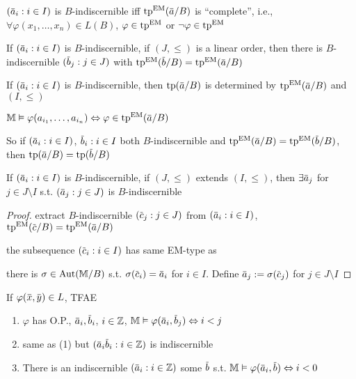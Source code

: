 \documentclass[11pt]{article}
\begin{document}
\begin{remark}
\((\bara_i:i\in I)\) is \(B\)-indiscernible iff \(\tp^{\EM}(\bara/B)\) is ``complete'',
i.e., \(\forall\varphi(x_1,\dots,x_n)\in L(B)\), \(\varphi\in\operatorname{tp}^{\operatorname{EM}}\) or \(\neg\varphi\in\operatorname{tp}^{\operatorname{EM}}\)
\end{remark}

\begin{theorem}[]
If \((\bara_i:i\in I)\) is \(B\)-indiscernible, if \((J,\le)\) is a linear order, then there
is \(B\)-indiscernible \((\barb_j:j\in J)\) with \(\tp^{\EM}(\barb/B)=\tp^{\EM}(\bara/B)\)
\end{theorem}

\begin{remark}
If \((\bara_i:i\in I)\) is \(B\)-indiscernible, then \(\tp(\bara/B)\) is determined
by \(\tp^{\EM}(\bara/B)\) and \((I,\le)\)

\(\M\vDash\varphi(a_{i_1},\dots,a_{i_n})\Leftrightarrow\varphi\in\tp^{\EM}(\bara/B)\)

So if \((\bara_i:i\in I)\), \(\barb_i:i\in I\) both \(B\)-indiscernible
and \(\tp^{\EM}(\bara/B)=\tp^{\EM}(\barb/B)\), then \(\tp(\bara/B)=\tp(\barb/B)\)
\end{remark}

\begin{theorem}
If \((\bara_i:i\in I)\) is \(B\)-indiscernible, if \((J,\le)\) extends \((I,\le)\), then \(\exists\bara_j\)
for \(j\in J\setminus I\) s.t. \((\bara_j:j\in J)\) is \(B\)-indiscernible
\end{theorem}

\begin{proof}
extract \(B\)-indiscernible \((\barc_j:j\in J)\)
from \((\bara_i:i\in I)\), \(\tp^{\EM}(\barc/B)=\tp^{\EM}(\bara/B)\)

the subsequence \((\barc_i:i\in I)\) has same EM-type as

there is \(\sigma\in\operatorname{\text{Aut}}(\mathbb{M}/B)\) s.t. \(\sigma(\barc_i)=\bara_i\) for \(i\in I\). Define \(\bara_j:=\sigma(\barc_j)\)
for \(j\in J\setminus I\)
\end{proof}

\begin{theorem}[]
\label{24-15}
If \(\varphi(\barx,\bary)\in L\), TFAE
\begin{enumerate}
\item \(\varphi\) has O.P., \(\bara_i,\barb_i\), \(i\in\mathbb{Z}\), \(\M\vDash\varphi(\bara_i,\barb_j)\Leftrightarrow i<j\)
\item same as (1) but \((\bara_i\barb_i:i\in\Z)\) is indiscernible
\item There is an indiscernible \((\bara_i:i\in\Z)\) some \(\barb\)
s.t. \(\M\vDash\varphi(\bara_i,\barb)\Leftrightarrow i<0\)
\end{enumerate}
\end{theorem}
\end{document}
